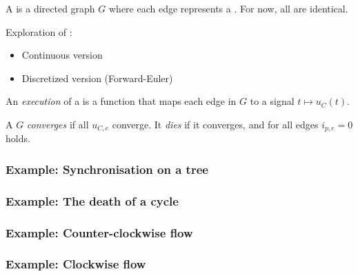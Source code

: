 \documentclass[	hyperref={pdfpagelabels=false}, xcolor=dvipsnames,
		11pt]{beamer}
\begin{document}
\begin{frame}
    \frametitle{\Pns}

    A \Pn is a directed graph $G$ where each edge represents a \Pe. For now, all \Pes are identical.

    \begin{alertblock}{Exploration of \Pns:}

    	\begin{itemize}
    		\item Continuous version
    		\item Discretized version (Forward-Euler)
    	\end{itemize}

    \end{alertblock}

    An \emph{execution} of a \Pn is a function that maps each edge in $G$ to a signal $t \mapsto u_C(t)$.

    A \Pn $G$ \emph{converges} if all $u_{C,e}$ converge. It \emph{dies} if it converges, and for all edges $i_{p,e} = 0$ holds.
\end{frame}

\begin{frame}
	\frametitle{Example: Synchronisation on a tree}
		\begin{figure}
			\centering
			\captionsetup[subfloat]{position=bottom,labelformat=empty,font=scriptsize}
		\end{figure}
\end{frame}

\begin{frame}
	\frametitle{Example: The death of a cycle}
		\begin{figure}
			\centering
			\captionsetup[subfloat]{position=bottom,labelformat=empty,font=scriptsize}
		\end{figure}
\end{frame}
\begin{frame}
	\frametitle{Example: Counter-clockwise flow}
		\begin{figure}
			\centering
			\captionsetup[subfloat]{position=bottom,labelformat=empty,font=scriptsize}
		\end{figure}
\end{frame}
\begin{frame}
	\frametitle{Example: Clockwise flow}
		\begin{figure}
			\centering
			\captionsetup[subfloat]{position=bottom,labelformat=empty,font=scriptsize}
		\end{figure}
\end{frame}
\end{document}
